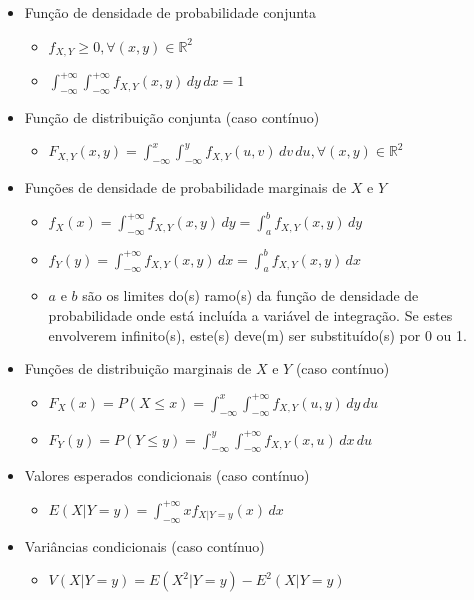 \documentclass[a4paper]{report}
\begin{document}
\begin{itemize}
\begin{itemize}
			\end{itemize}
			\item Função de densidade de probabilidade conjunta
			\begin{itemize}
				\item $f_{X,Y}\geq 0,\forall (x,y)\in\mathbb R^2$
				\item $\int_{-\infty}^{+\infty}\int_{-\infty}^{+\infty} f_{X,Y}(x,y)\,dy\,dx=1$
			\end{itemize}
			\item Função de distribuição conjunta (caso contínuo)
			\begin{itemize}
				\item $F_{X,Y}(x,y)=\int_{-\infty}^x\int_{-\infty}^yf_{X,Y}(u,v)\,dv\,du,\forall(x,y)\in\mathbb R^2$
			\end{itemize}
			\item Funções de densidade de probabilidade marginais de $X$ e $Y$
			\begin{itemize}
				\item $f_X(x)=\int_{-\infty}^{+\infty}f_{X,Y}(x,y)\,dy=\int_{a}^{b}f_{X,Y}(x,y)\,dy$
				\item $f_Y(y)=\int_{-\infty}^{+\infty}f_{X,Y}(x,y)\,dx=\int_{a}^{b}f_{X,Y}(x,y)\,dx$
				\item $a$ e $b$ são os limites do(s) ramo(s) da função de densidade de probabilidade onde está incluída a variável de integração. Se estes envolverem infinito(s), este(s) deve(m) ser substituído(s) por 0 ou 1.
			\end{itemize}
			\item Funções de distribuição marginais de $X$ e $Y$ (caso contínuo)
			\begin{itemize}
				\item $F_X(x)=P(X\leq x)=\int_{-\infty}^x\int_{-\infty}^{+\infty}f_{X,Y}(u,y)\,dy\,du$
				\item $F_Y(y)=P(Y\leq y)=\int_{-\infty}^y\int_{-\infty}^{+\infty}f_{X,Y}(x,u)\,dx\,du$
			\end{itemize}
			\item Valores esperados condicionais (caso contínuo)
			\begin{itemize}
				\item $E(X|Y=y)=\int_{-\infty}^{+\infty}xf_{X|Y=y}(x)\,dx$
			\end{itemize}
			\item Variâncias condicionais (caso contínuo)
			\begin{itemize}
				\item $V(X|Y=y)=E(X^2|Y=y)-E^2(X|Y=y)$

\end{itemize}
\end{itemize}
\end{document}
